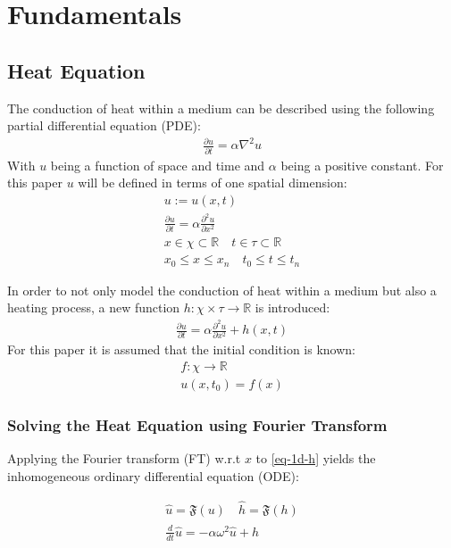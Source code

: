 \chapter{Fundamentals}
\section{Heat Equation} \label{HE}
The conduction of heat  within a medium can be described using the following partial differential equation (PDE):
\begin{gather}
\frac{\partial u}{\partial t} = \alpha \nabla^{2} u \label{heat}
\end{gather}
With \(u\) being a function of space and time and \(\alpha\) being a positive constant.
For this paper \(u\) will be defined in terms of one spatial dimension:
\begin{gather}
u := u(x, t) \\
\frac{\partial u}{\partial t} = \alpha \frac{\partial^{2} u}{\partial x^{2}} \\
x \in \chi \subset \mathbb{R} \quad t \in \tau \subset \mathbb{R} \\
x_{0} \leq x \leq x_{n} \quad t_{0} \leq t \leq t_{n} 
\end{gather}
\cite{Gustafsson2011}

In order to not only model the conduction of heat within a medium but also a heating process, a new function \(h: \chi \times \tau \rightarrow  \mathbb{R}\) is introduced:
\begin{gather}
\frac{\partial u}{\partial t} = \alpha \frac{\partial^{2} u}{\partial x^{2}} + h(x,t) \label{eq-1d-h}
\end{gather}
For this paper it is assumed that the initial condition is known:
\begin{gather}
f: \chi \rightarrow \mathbb{R} \\
u(x, t_{0}) = f(x) 
\end{gather} 
\subsection{Solving the Heat Equation using Fourier Transform}
Applying the Fourier transform (FT) w.r.t \(x\) to \ref{eq-1d-h} yields the inhomogeneous ordinary differential equation (ODE):

\begin{gather}
\hat{u} = \mathfrak{F}(u) \quad \hat{h} = \mathfrak{F}(h) \\
\frac{d}{dt} \hat{u} = -\alpha\omega^{2}\hat{u} + \hat{h} \label{eq-1d-h-ft}
\end{gather}

